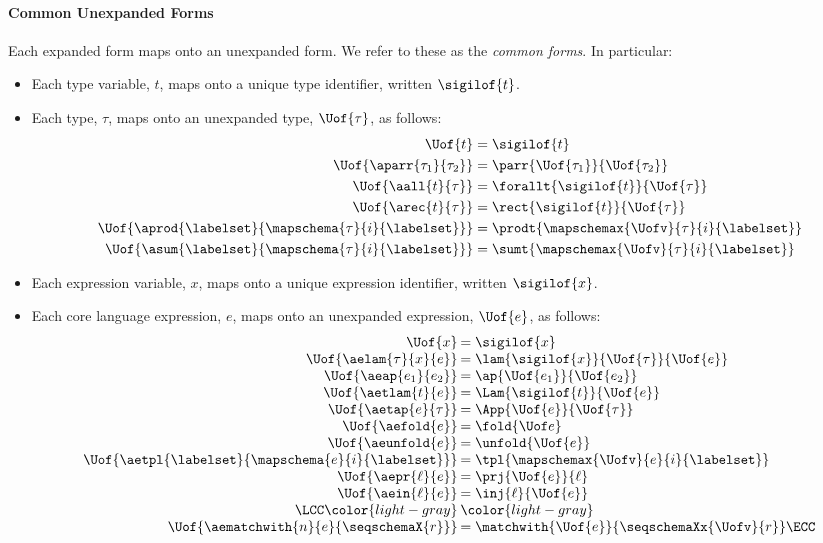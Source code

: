\paragraph{Common Unexpanded Forms} Each expanded form maps onto an unexpanded form. We refer to these as the \emph{common forms}. In particular:
\begin{itemize}
\item Each type variable, $t$, maps onto a unique {type identifier}, written $\sigilof{t}$.
\item Each type, $\tau$, maps onto an unexpanded type, $\Uof{\tau}$, as follows: 
  \begin{align*}
  \Uof{t} &= \sigilof{t}\\
  \Uof{\aparr{\tau_1}{\tau_2}} & = \parr{\Uof{\tau_1}}{\Uof{\tau_2}}\\
  \Uof{\aall{t}{\tau}} & = \forallt{\sigilof{t}}{\Uof{\tau}}\\
  \Uof{\arec{t}{\tau}} & = \rect{\sigilof{t}}{\Uof{\tau}}\\
  \Uof{\aprod{\labelset}{\mapschema{\tau}{i}{\labelset}}} & = \prodt{\mapschemax{\Uofv}{\tau}{i}{\labelset}}\\
  \Uof{\asum{\labelset}{\mapschema{\tau}{i}{\labelset}}} & = \sumt{\mapschemax{\Uofv}{\tau}{i}{\labelset}}
  \end{align*}
\item Each expression variable, $x$, maps onto a unique expression identifier, written $\sigilof{x}$.
\item Each core language expression, $e$, maps onto an unexpanded expression, $\Uof{e}$, as follows:
\[\arraycolsep=1pt\begin{array}{rl}
\Uof{x} & = \sigilof{x}\\
\Uof{\aelam{\tau}{x}{e}} & = \lam{\sigilof{x}}{\Uof{\tau}}{\Uof{e}}\\
\Uof{\aeap{e_1}{e_2}} & = \ap{\Uof{e_1}}{\Uof{e_2}}\\
\Uof{\aetlam{t}{e}} & = \Lam{\sigilof{t}}{\Uof{e}}\\
\Uof{\aetap{e}{\tau}} & = \App{\Uof{e}}{\Uof{\tau}}\\
\Uof{\aefold{e}} & = \fold{\Uof e}\\
\Uof{\aeunfold{e}} & = \unfold{\Uof{e}}\\
\Uof{\aetpl{\labelset}{\mapschema{e}{i}{\labelset}}} & = \tpl{\mapschemax{\Uofv}{e}{i}{\labelset}}\\
\Uof{\aepr{\ell}{e}} & = \prj{\Uof{e}}{\ell}\\
\Uof{\aein{\ell}{e}} &= \inj{\ell}{\Uof{e}}\\
\LCC \color{light-gray} & \color{light-gray} \\
\Uof{\aematchwith{n}{e}{\seqschemaX{r}}} & = \matchwith{\Uof{e}}{\seqschemaXx{\Uofv}{r}}\ECC
\end{array}\]
\end{itemize}
